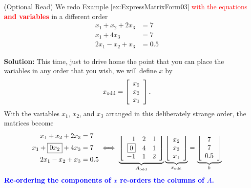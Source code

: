 \begin{example}
\label{ex:ExpressMatrixForm03C}
(Optional Read) We redo Example \ref{ex:ExpressMatrixForm03}  \textcolor{red}{with the equations {\bf and variables}} in a different order
\begin{equation}
\begin{aligned}
x_1+x_2+2x_3 &=7 \\
x_1 + 4 x_3 &=7 \\
2x_1-x_2+x_3&=0.5
\end{aligned}
\end{equation}
\end{example}

\textbf{Solution:} This time, just to drive home the point that you can place the variables in any order that you wish, we will define $x$ by
$$ x_{\rm odd} = \left[\begin{array}{c} x_2\\ x_3 \\ x_1\end{array}\right]. $$
With the variables $x_1$, $x_2$, and $x_3$ arranged in this deliberately strange order, the matrices become
\begin{equation}
\label{eq:Axeqb04C2}
\begin{aligned}
x_1+x_2+2x_3 &=7 \\
x_1 + \boxed{ 0 x_2} +  4 x_3 &=7\\
2x_1-x_2+x_3&=0.5\\
\end{aligned}
\iff \underbrace{\left[\begin{array}{rrr}  1 & 2 & 1 \\ \boxed{0} & 4 & 1  \\
 -1 & 1 & 2 \end{array}\right]}_{A_{\rm odd}} \underbrace{\left[\begin{array}{c} x_2\\ x_3 \\ x_1\end{array}\right]}_{x_{\rm odd}} =   \underbrace{\left[\begin{array}{c} 7 \\  7 \\0.5 \end{array}\right]}_{b}
\end{equation}
\textcolor{blue}{\bf Re-ordering the components of $x$ re-orders the columns of $A$.} 
\Qed

\vspace*{0.2cm}

